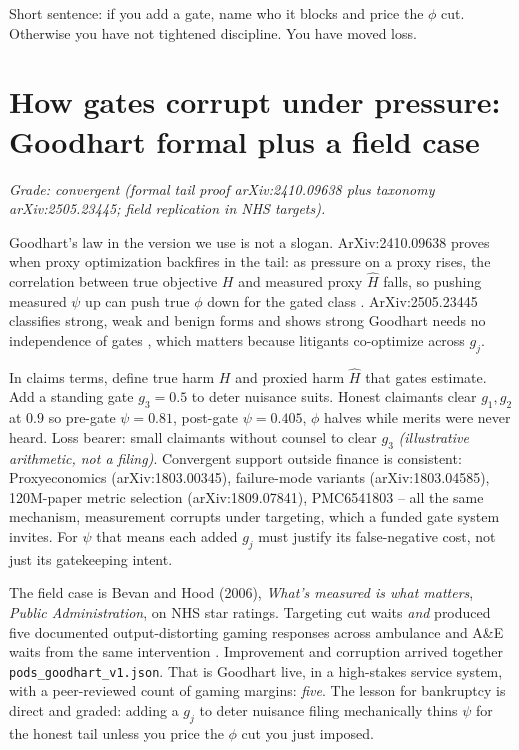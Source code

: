 Short sentence: if you add a gate, name who it blocks and price the $\phi$ cut. Otherwise you have not tightened discipline. You have moved loss.

\section{How gates corrupt under pressure: Goodhart formal plus a field case}
\label{sec:goodhart}

\textit{Grade: convergent (formal tail proof arXiv:2410.09638 plus taxonomy arXiv:2505.23445; field replication in NHS targets).}

Goodhart's law in the version we use is not a slogan. ArXiv:2410.09638 proves when proxy optimization backfires in the tail: as pressure on a proxy rises, the correlation between true objective $H$ and measured proxy $\hat H$ falls, so pushing measured $\psi$ up can push true $\phi$ down for the gated class \citep{goodhart2410}. ArXiv:2505.23445 classifies strong, weak and benign forms and shows strong Goodhart needs no independence of gates \citep{goodhart2505}, which matters because litigants co-optimize across $g_j$.

In claims terms, define true harm $H$ and proxied harm $\hat H$ that gates estimate. Add a standing gate $g_3=0.5$ to deter nuisance suits. Honest claimants clear $g_1,g_2$ at $0.9$ so pre-gate $\psi=0.81$, post-gate $\psi=0.405$, $\phi$ halves while merits were never heard. Loss bearer: small claimants without counsel to clear $g_3$ \textit{(illustrative arithmetic, not a filing)}. Convergent support outside finance is consistent: Proxyeconomics (arXiv:1803.00345), failure-mode variants (arXiv:1803.04585), 120M-paper metric selection (arXiv:1809.07841), PMC6541803 -- all the same mechanism, measurement corrupts under targeting, which a funded gate system invites. For $\psi$ that means each added $g_j$ must justify its false-negative cost, not just its gatekeeping intent.

The field case is Bevan and Hood (2006), \textit{What's measured is what matters}, \textit{Public Administration}, on NHS star ratings. Targeting cut waits \textit{and} produced five documented output-distorting gaming responses across ambulance and A\&E waits from the same intervention \citep{bevan2006}. Improvement and corruption arrived together \texttt{pods\_goodhart\_v1.json}. That is Goodhart live, in a high-stakes service system, with a peer-reviewed count of gaming margins: \textit{five}. The lesson for bankruptcy is direct and graded: adding a $g_j$ to deter nuisance filing mechanically thins $\psi$ for the honest tail unless you price the $\phi$ cut you just imposed.

